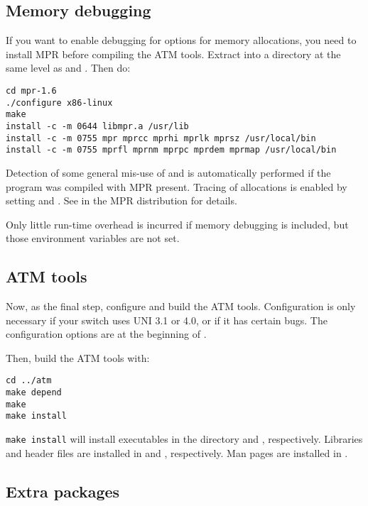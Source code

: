 \subsection{Memory debugging}

If you want to enable debugging for options for memory allocations, you
need to install MPR before compiling the ATM tools. Extract
 into a directory at the same level as 
and . Then do:

\begin{verbatim}
cd mpr-1.6
./configure x86-linux
make
install -c -m 0644 libmpr.a /usr/lib
install -c -m 0755 mpr mprcc mprhi mprlk mprsz /usr/local/bin
install -c -m 0755 mprfl mprnm mprpc mprdem mprmap /usr/local/bin
\end{verbatim}

Detection of some general mis-use of  and  is
automatically performed if the program was compiled with MPR present.
Tracing of allocations is enabled by setting  and .
See  in the MPR distribution for details.

Only little run-time overhead is incurred if memory debugging is included,
but those environment variables are not set.


\subsection{ATM tools}

Now, as the final step, configure and build the ATM tools. Configuration is
only necessary if your switch uses UNI 3.1 or 4.0, or if it has certain bugs.
The configuration options are at the beginning of .

Then, build the ATM tools with:

\begin{verbatim}
cd ../atm
make depend
make
make install
\end{verbatim}

\verb"make install" will install executables in the directory
 and , respectively.
Libraries and header files are installed in
 and , respectively. Man pages are
installed in .


\subsection{Extra packages}

